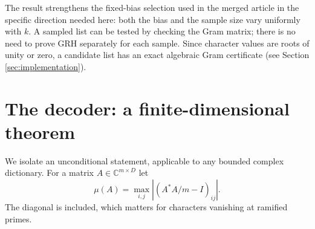 \documentclass[11pt]{article}
\theoremstyle{remark}\newtheorem{remark}[theorem]{Remark}
\newcommand{\C}{\mathbb C}
\newcommand{\abs}[1]{\left|#1\right|}
\begin{document}
The result strengthens the fixed-bias selection used in the merged article in the specific direction needed here: both the bias and the sample size vary uniformly with $k$. A sampled list can be tested by checking the Gram matrix; there is no need to prove GRH separately for each sample. Since character values are roots of unity or zero, a candidate list has an exact algebraic Gram certificate (see Section \ref{sec:implementation}).

\section{The decoder: a finite-dimensional theorem}\label{sec:decoder}
We isolate an unconditional statement, applicable to any bounded complex dictionary. For a matrix $A\in\C^{m\times D}$ let
\[
 \mu(A)=\max_{i,j}\abs{(A^*A/m-I)_{ij}}.
\]
The diagonal is included, which matters for characters vanishing at ramified primes.
\end{document}
